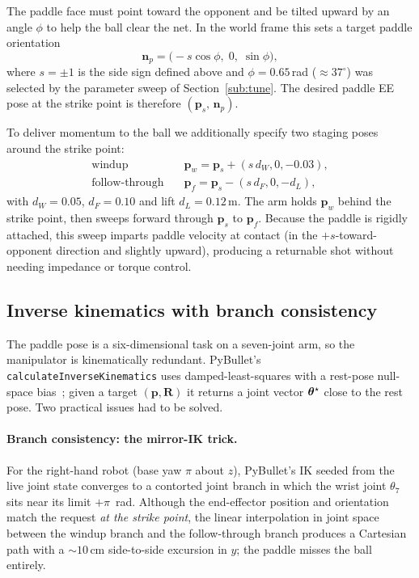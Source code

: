 The paddle face must point toward the opponent and be tilted upward by an
angle $\phi$ to help the ball clear the net. In the world frame this
sets a target paddle orientation
\begin{equation}
  \mathbf{n}_{p}=\bigl(-s\cos\phi,\;0,\;\sin\phi\bigr),
\end{equation}
where $s=\pm 1$ is the side sign defined above and
$\phi=0.65$\,rad ($\approx 37^{\circ}$) was selected by the parameter
sweep of Section~\ref{sub:tune}. The desired paddle EE pose at the
strike point is therefore $(\mathbf{p}_{s},\,\mathbf{n}_{p})$.

To deliver momentum to the ball we additionally specify two staging
poses around the strike point:
\begin{align}
  \text{windup}    \quad &\mathbf{p}_{w}=\mathbf{p}_{s}+(s\,d_{W},0,-0.03), \\
  \text{follow-through}\quad &\mathbf{p}_{f}=\mathbf{p}_{s}-(s\,d_{F},0,-d_{L}),
\end{align}
with $d_{W}=0.05$, $d_{F}=0.10$ and lift $d_{L}=0.12$\,m. The arm holds
$\mathbf{p}_{w}$ behind the strike point, then sweeps forward through
$\mathbf{p}_{s}$ to $\mathbf{p}_{f}$. Because the paddle is rigidly
attached, this sweep imparts paddle velocity at contact (in the
$+s$-toward-opponent direction and slightly upward), producing a
returnable shot without needing impedance or torque control.

\subsection{Inverse kinematics with branch consistency}
\label{sub:ik}

The paddle pose is a six-dimensional task on a seven-joint arm, so the
manipulator is kinematically redundant. PyBullet's
\texttt{calculateInverseKinematics} uses damped-least-squares with a
rest-pose null-space bias~\cite{buss2004ik}; given a target
$(\mathbf{p},\mathbf{R})$ it returns a joint vector $\boldsymbol{\theta}^{\star}$ close
to the rest pose. Two practical issues had to be solved.

\paragraph{Branch consistency: the mirror-IK trick.}
For the right-hand robot (base yaw $\pi$ about $z$), PyBullet's IK
seeded from the live joint state converges to a contorted joint branch
in which the wrist joint $\theta_{7}$ sits near its limit
$+\pi$~rad. Although the end-effector position and orientation match
the request \emph{at the strike point}, the linear interpolation in
joint space between the windup branch and the follow-through branch
produces a Cartesian path with a $\sim 10$\,cm side-to-side excursion in
$y$; the paddle misses the ball entirely.

